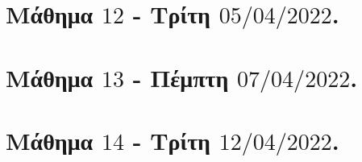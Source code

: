 \documentclass[oneside,a4paper]{article}
\begin{document}
\pagebreak


\section*{Μάθημα $12$ - Τρίτη $05/04/2022$.}
\vspace{0.3truecm}


\pagebreak

\section*{Μάθημα $13$ - Πέμπτη $07/04/2022$.}
\vspace{0.3truecm}


\pagebreak



\section*{Μάθημα $14$ - Τρίτη $12/04/2022$.}
\vspace{0.3truecm}


\pagebreak
\end{document}
